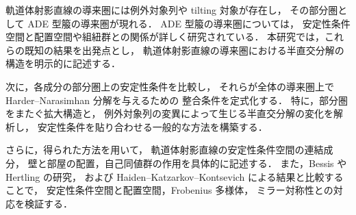 \documentclass[leqno]{ltjsarticle}
\begin{document}
軌道体射影直線の導来圏には例外対象列や tilting 対象が存在し，
その部分圏として ADE 型箙の導来圏が現れる．
ADE 型箙の導来圏については，
安定性条件空間と配置空間や組紐群との関係が詳しく研究されている．
本研究では，これらの既知の結果を出発点とし，
軌道体射影直線の導来圏における半直交分解の構造を明示的に記述する．

次に，各成分の部分圏上の安定性条件を比較し，
それらが全体の導来圏上で Harder--Narasimhan 分解を与えるための
整合条件を定式化する．
特に，部分圏をまたぐ拡大構造と，
例外対象列の変異によって生じる半直交分解の変化を解析し，
安定性条件を貼り合わせる一般的な方法を構築する．

さらに，得られた方法を用いて，
軌道体射影直線の安定性条件空間の連結成分，
壁と部屋の配置，自己同値群の作用を具体的に記述する．
また，Bessis や Hertling の研究，
および Haiden--Katzarkov--Kontsevich による結果と比較することで，
安定性条件空間と配置空間，Frobenius 多様体，
ミラー対称性との対応を検証する．
\end{document}
